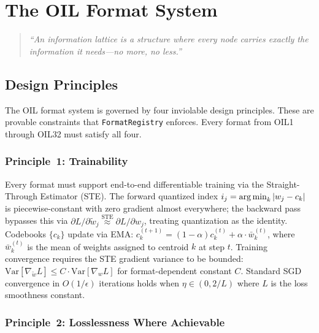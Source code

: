 
\chapter{The OIL Format System}
\label{ch:oil_formats}

\begin{quote}
\textit{``An information lattice is a structure where every node carries
exactly the information it needs---no more, no less.''}
\end{quote}

\section{Design Principles}
\label{sec:format_design_principles}

The OIL format system is governed by four inviolable design principles.
These are provable constraints that \texttt{FormatRegistry} enforces.
Every format from OIL1 through OIL32 must satisfy all four.

\subsection{Principle~1: Trainability}

Every format must support end-to-end differentiable training via the
Straight-Through Estimator (STE). The forward quantized index
$i_j = \argmin_k |w_j - c_k|$ is piecewise-constant with zero
gradient almost everywhere; the backward pass bypasses this via
$\partial L / \partial \tilde{w}_j \stackrel{\text{STE}}{\approx}
\partial L / \partial w_j$, treating quantization as the identity.
Codebooks $\{c_k\}$ update via EMA: $c_k^{(t+1)} = (1 - \alpha) c_k^{(t)}
+ \alpha \cdot \bar{w}_k^{(t)}$, where $\bar{w}_k^{(t)}$ is the mean of
weights assigned to centroid $k$ at step $t$. Training convergence
requires the STE gradient variance to be bounded:
$\mathrm{Var}[\nabla_{\tilde{w}} L] \leq C \cdot
\mathrm{Var}[\nabla_w L]$ for format-dependent constant $C$.
Standard SGD convergence in $O(1/\epsilon)$ iterations holds when
$\eta \in (0, 2/L)$ where $L$ is the loss smoothness constant.

\subsection{Principle~2: Losslessness Where Achievable}

